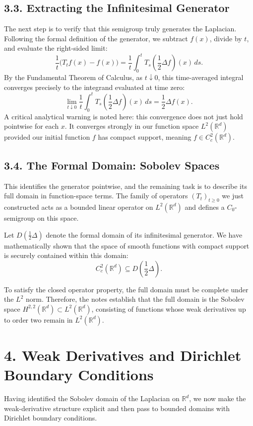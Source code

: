 \documentclass[11pt]{article}
\theoremstyle{definition}
\theoremstyle{remark}
\begin{document}
\subsection*{3.3. Extracting the Infinitesimal Generator}
The next step is to verify that this semigroup truly generates the Laplacian. Following the formal definition of the generator, we subtract \(f(x)\), divide by \(t\), and evaluate the right-sided limit:
\[
\frac1t\bigl(T_t f(x)-f(x)\bigr)
=
\frac1t\int_0^t T_s\!\left(\frac12 \Delta f\right)(x)\,ds.
\]
By the Fundamental Theorem of Calculus, as \(t\downarrow 0\), this time-averaged integral converges precisely to the integrand evaluated at time zero:
\[
\lim_{t\downarrow 0}\frac1t\int_0^t T_s\!\left(\frac12 \Delta f\right)(x)\,ds
=
\frac12\Delta f(x).
\]
A critical analytical warning is noted here: this convergence does not just hold pointwise for each \(x\). It converges strongly in our function space \(L^2(\mathbb R^d)\) provided our initial function \(f\) has compact support, meaning \(f\in C_c^2(\mathbb R^d)\).

\subsection*{3.4. The Formal Domain: Sobolev Spaces}
This identifies the generator pointwise, and the remaining task is to describe its full domain in function-space terms. The family of operators \((T_t)_{t\ge 0}\) we just constructed acts as a bounded linear operator on \(L^2(\mathbb R^d)\) and defines a \(C_0\)-semigroup on this space.

Let \(D\!\left(\frac12\Delta\right)\) denote the formal domain of its infinitesimal generator. We have mathematically shown that the space of smooth functions with compact support is securely contained within this domain:
\[
C_c^2(\mathbb R^d)\subseteq D\!\left(\frac12\Delta\right).
\]

To satisfy the closed operator property, the full domain must be complete under the \(L^2\) norm. Therefore, the notes establish that the full domain is the Sobolev space \(H^{2,2}(\mathbb R^d)\subset L^2(\mathbb R^d)\), consisting of functions whose weak derivatives up to order two remain in \(L^2(\mathbb R^d)\).


\section*{4. Weak Derivatives and Dirichlet Boundary Conditions}
Having identified the Sobolev domain of the Laplacian on \(\mathbb R^d\), we now make the weak-derivative structure explicit and then pass to bounded domains with Dirichlet boundary conditions.
\end{document}
